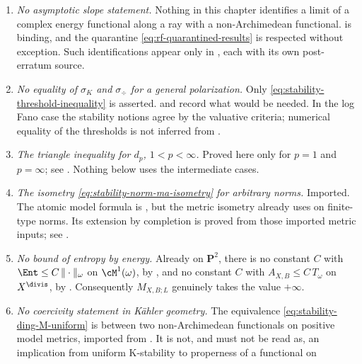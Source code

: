\begin{enumerate}
\item\label{itm:ch50-nc:erratum}
      \emph{No asymptotic slope statement.}  Nothing in this chapter
      identifies a limit of a complex energy functional along a ray with a
      non-Archimedean functional.   is
      binding, and the quarantine
      \eqref{eq:rf-quarantined-results} is respected without exception.
      Such identifications appear only in ,
      each with its own post-erratum source.
\item\label{itm:ch50-nc:gap}
      \emph{No equality of $\sigma_K$ and $\sigma_{\div}$ for a general
      polarization.}  Only \eqref{eq:stability-threshold-inequality} is
      asserted.   and
       record what would be needed.  In the
      log Fano case the stability notions agree by the valuative criteria;
      numerical equality of the thresholds is not inferred from
      \cite{LXZ22}.
\item\label{itm:ch50-nc:dp}
      \emph{The triangle inequality for $d_p$, $1<p<\infty$.}  Proved
      here only for $p=1$ and $p=\infty$; see
      .  Nothing below uses the intermediate
      cases.
\item\label{itm:ch50-nc:completion}
      \emph{The isometry \eqref{eq:stability-norm-ma-isometry} for
      arbitrary norms.}  Imported.  The atomic model formula is
      , but the metric isometry already uses
      \cite{BJKS1} on finite-type norms.  Its extension by completion is
      proved from those imported metric inputs; see .
\item\label{itm:ch50-nc:entropy-bound}
      \emph{No bound of entropy by energy.}  Already on $\mathbf P^2$, there is no constant $C$
      with $\Ent\le C\,\|\cdot\|_\omega$ on $\cM^1(\omega)$, by
      , and no constant $C$ with
      $A_{X,B}\le C\,T_\omega$ on $X^{\divis}$, by
      .  Consequently $M_{X,B;L}$ genuinely takes
      the value $+\infty$.
\item\label{itm:ch50-nc:coercivity}
      \emph{No coercivity statement in K\"ahler geometry.}  The
      equivalence \eqref{eq:stability-ding-M-uniform} is between two
      non-Archimedean functionals on positive model metrics, imported from
      \cite[Theorem~8.6]{BHJ17}.  It is not, and must not be read as, an
      implication from uniform K-stability to properness of a functional on

\end{enumerate}

